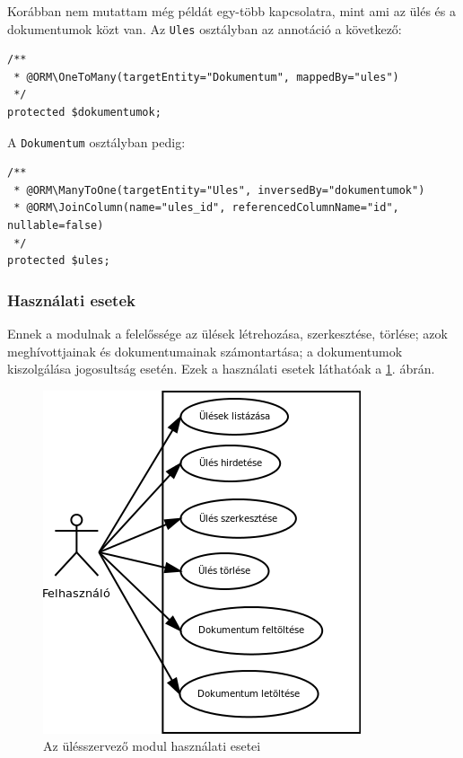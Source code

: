 \documentclass[a4paper,12pt,oneside]{report}
\begin{document}
Korábban nem mutattam még példát egy-több kapcsolatra, mint ami az ülés és a dokumentumok közt van. Az {\tt Ules} osztályban az annotáció a következő:

\begin{lstlisting}
/**
 * @ORM\OneToMany(targetEntity="Dokumentum", mappedBy="ules")
 */
protected $dokumentumok;
\end{lstlisting}

A {\tt Dokumentum} osztályban pedig:

\begin{lstlisting}
/**
 * @ORM\ManyToOne(targetEntity="Ules", inversedBy="dokumentumok")
 * @ORM\JoinColumn(name="ules_id", referencedColumnName="id", nullable=false)
 */
protected $ules;
\end{lstlisting}

\subsubsection*{Használati esetek}

Ennek a modulnak a felelőssége az ülések létrehozása, szerkesztése, törlése; azok meghívottjainak és dokumentumainak számontartása; a dokumentumok kiszolgálása jogosultság esetén. Ezek a használati esetek láthatóak a \ref{fig:ules_usecase}. ábrán.

\begin{figure}[h]
    \includegraphics[width=\textwidth]{ules_usecase.png}
    \caption{Az ülésszervező modul használati esetei}
    \label{fig:ules_usecase}
\end{figure}
\end{document}

